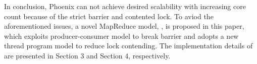 

In conclusion, Phoenix can not achieve desired scalability with increasing core count because of the strict barrier and contented lock.
To aviod the aforementioned issues, a novel MapReduce model, \myds,  is proposed in this paper,
which exploits producer-consumer model to break barrier
and adopts a new thread program model to reduce lock contending.
The implementation details of \myds are presented in Section 3 and Section 4, respectively.  







